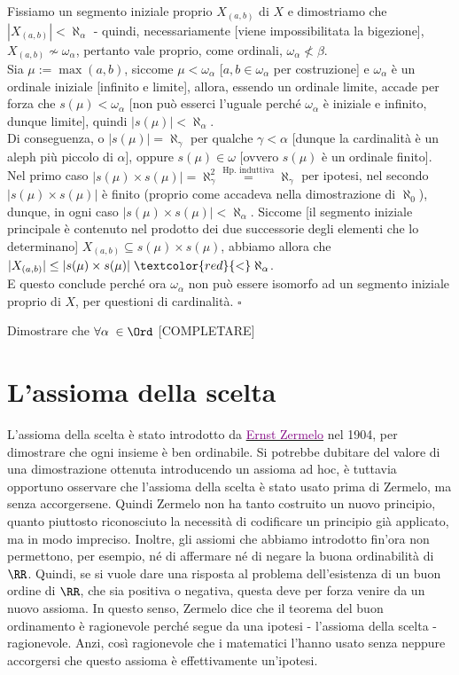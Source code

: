 \documentclass[11pt]{scrartcl}
\begin{document}
	Fissiamo un segmento iniziale proprio $X_{(a,b)}$ di $X$ e dimostriamo che $|X_{(a,b)}| < \aleph_\alpha$ -  quindi, necessariamente [viene impossibilitata la bigezione], $X_{(a,b)} \not \sim \omega_\alpha$, pertanto vale proprio, come ordinali, $\omega_\alpha \not < \beta$.\\
	Sia $\mu := \max(a,b)$, siccome $\mu < \omega_\alpha$ [$a,b \in \omega_\alpha$ per costruzione] e $\omega_\alpha$ è un ordinale iniziale [infinito e limite], allora, essendo un ordinale limite, accade per forza che $s(\mu) < \omega_\alpha$ [non può esserci l'uguale perché $\omega_\alpha$ è iniziale e infinito, dunque limite], quindi $|s(\mu)| < \aleph_\alpha$.\\
	Di conseguenza, o $|s(\mu)| = \aleph_\gamma$ per qualche $\gamma < \alpha$ [dunque la cardinalità è un aleph più piccolo di $\alpha$], oppure $s(\mu) \in \omega$ [ovvero $s(\mu)$ è un ordinale finito].
	Nel primo caso $|s(\mu) \times s(\mu)| = \aleph_\gamma^2 \overset{\text{Hp. induttiva}}{=} \aleph_\gamma$ per ipotesi, nel secondo $|s(\mu) \times s(\mu)|$ è finito (proprio come accadeva nella dimostrazione di $\aleph_0$), dunque, in ogni caso $|s(\mu) \times s(\mu)| < \aleph_\alpha$.
	Siccome [il segmento iniziale principale è contenuto nel prodotto dei due successorie degli elementi che lo determinano] $X_{(a,b)} \subseteq s(\mu) \times s(\mu)$, abbiamo allora che $|X_{(a,b)}| \leq |s(\mu) \times s(\mu)| \;\textcolor{red}{<}\; \aleph_\alpha$.\\
 	E questo conclude perché ora $\omega_\alpha$ non può essere isomorfo ad un segmento iniziale proprio di $X$, per questioni di cardinalità. \hfill $\square$

\begin{exercise}
	Dimostrare che $\forall \alpha \; \in \Ord$ [COMPLETARE]
\end{exercise}


\pagebreak
\section{L'assioma della scelta}
L'assioma della scelta è stato introdotto da \href{https://en.wikipedia.org/wiki/Ernst_Zermelo}{\textcolor{purple}{Ernst Zermelo}} nel 1904, per dimostrare che ogni insieme è ben ordinabile.
Si potrebbe dubitare del valore di una dimostrazione ottenuta introducendo un assioma ad hoc, è tuttavia opportuno osservare che l'assioma della scelta è stato usato prima di Zermelo, ma senza accorgersene.
Quindi Zermelo non ha tanto costruito un nuovo principio, quanto piuttosto riconosciuto la necessità di codificare un principio già applicato, ma in modo impreciso.
Inoltre, gli assiomi che abbiamo introdotto fin'ora non permettono, per esempio, né di affermare né di negare la buona ordinabilità di $\RR$. Quindi, se si vuole dare una risposta al problema dell'esistenza di un buon ordine 
di $\RR$, che sia positiva o negativa, questa deve per forza venire da un nuovo assioma. In questo senso, Zermelo dice che il teorema del buon ordinamento è ragionevole perché segue da una ipotesi - l'assioma della scelta - ragionevole.
Anzi, così ragionevole che i matematici l'hanno usato senza neppure accorgersi che questo assioma è effettivamente un'ipotesi.
\end{document}
